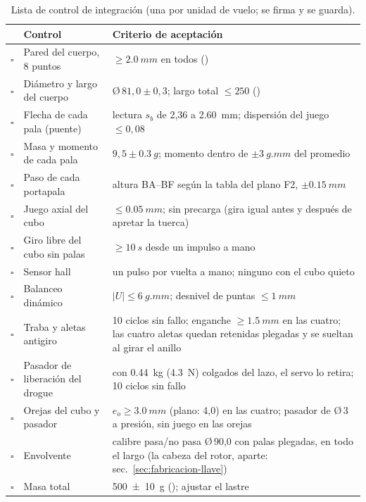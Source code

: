 \begin{table}[H]
\centering\small
\caption{Lista de control de integración (una por unidad de vuelo; se firma y se guarda).}
\label{tab:fabricacion-check-int}
\begin{tabularx}{\textwidth}{@{}clY@{}}
\toprule
& \textbf{Control} & \textbf{Criterio de aceptación}\\\midrule
$\square$ & Pared del cuerpo, 8 puntos & $\ge\SI{2.0}{mm}$ en todos ()\\
$\square$ & Diámetro y largo del cuerpo & Ø\,$81{,}0\pm0{,}3$; largo total $\le250$ ()\\
$\square$ & Flecha de cada pala (puente) & lectura $s_b$ de 2,36 a \SI{2.60}{mm}; dispersión del juego $\le0{,}08$\\
$\square$ & Masa y momento de cada pala & $9{,}5\pm\SI{0.3}{g}$; momento dentro de $\pm\SI{3}{g.mm}$ del promedio\\
$\square$ & Paso de cada portapala & altura BA--BF según la tabla del plano F2, $\pm\SI{0.15}{mm}$\\
$\square$ & Juego axial del cubo & $\le\SI{0.05}{mm}$; sin precarga (gira igual antes y después de apretar la tuerca)\\
$\square$ & Giro libre del cubo sin palas & $\ge\SI{10}{s}$ desde un impulso a mano\\
$\square$ & Sensor hall & un pulso por vuelta a mano; ninguno con el cubo quieto\\
$\square$ & Balanceo dinámico & $|U|\le\SI{6}{g.mm}$; desnivel de puntas $\le\SI{1}{mm}$\\
$\square$ & Traba y aletas antigiro & 10 ciclos sin fallo; enganche $\ge\SI{1.5}{mm}$ en las cuatro; las cuatro aletas quedan retenidas plegadas y se sueltan al girar el anillo\\
$\square$ & Pasador de liberación del drogue & con \SI{0.44}{kg} (\SI{4.3}{N}) colgados del lazo, el servo lo retira; 10 ciclos sin fallo\\
$\square$ & Orejas del cubo y pasador & $e_o\ge\SI{3.0}{mm}$ (plano: 4,0) en las cuatro; pasador de Ø\,3 a presión, sin juego en las orejas\\
$\square$ & Envolvente & calibre pasa/no pasa Ø\,90,0 con palas plegadas, en todo el largo (la cabeza del rotor, aparte: sec.~\ref{sec:fabricacion-llave})\\
$\square$ & Masa total & \SI{500 \pm 10}{g} (); ajustar el lastre\\
\bottomrule
\end{tabularx}
\end{table}


